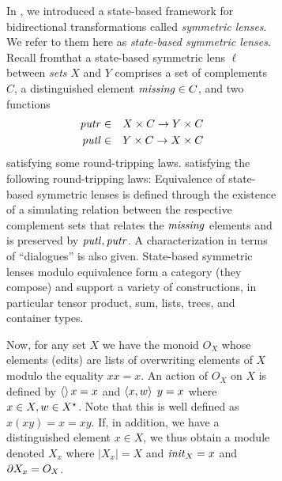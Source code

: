 \begin{figure}
\begin{figure}
\label{stateb}

\ifcomplement
In \cite{HofmannPierceWagner10}, we introduced a
state-based framework for bidirectional transformations called
\emph{symmetric lenses}.  We refer to them here as \emph{state-based symmetric
  lenses}.
\fi
Recall from\symmlenses that a state-based symmetric lens $\ell$
between \emph{sets} $X$ and $Y$ comprises a set of complements $C$, a
distinguished element $\mathit{missing} \in C$, and two functions
\begin{eqnarray*}
    \mathit{putr} &\in& X \times C \to Y \times C\\
    \mathit{putl} &\in& Y \times C \to X \times C
\end{eqnarray*}
\ifdissertation
satisfying some round-tripping laws.
\else
satisfying the following round-tripping laws:
Equivalence of state-based symmetric lenses is defined through the
existence of a simulating relation between the respective complement
sets that relates the $\mathit{missing}$ elements and is preserved by
$\mathit{putl},\mathit{putr}$. A characterization in terms of ``dialogues'' is also given. 
%
State-based symmetric lenses modulo equivalence form a category (they
compose) and support a variety of constructions, in particular tensor
product, sum, lists, trees, and container types.

\fi
Now, for any set $X$ we have the monoid $O_X$ whose elements (edits)
are lists of overwriting elements of $X$ modulo the equality $xx=x$. An
action of $O_X$ on $X$ is defined by $\left<\right> x=x$ and $\left< x, w\right>\;y=x$
where $x\in X, w\in X^\star$. Note that this is well defined as
$x(xy)=x=xy$. If, in addition, we have a distinguished element $x\in
X$, we thus obtain a module denoted $X_x$ where $|X_x|=X$ and
$\mathit{init}_X=x$ and $\partial X_x = O_X$.


\end{figure}
\end{figure}
